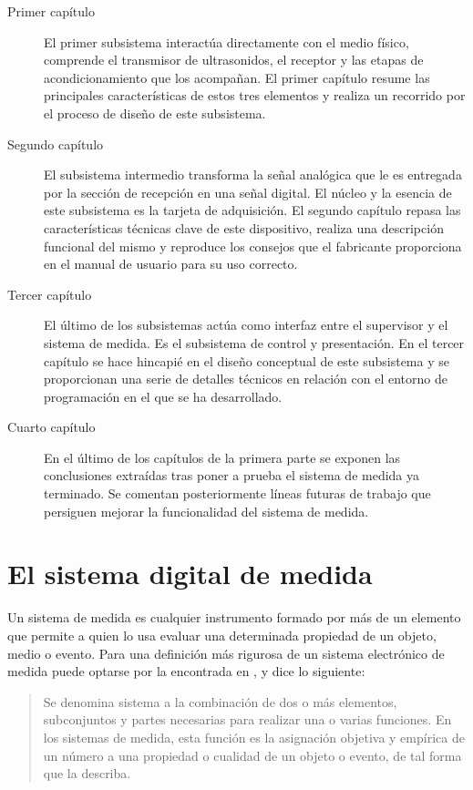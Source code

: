 \begin{description}
    \item[Primer capítulo] El primer subsistema interactúa directamente con
	el medio físico, comprende el transmisor de ultrasonidos, el
	receptor y las etapas de acondicionamiento que los acompañan. El
	primer capítulo resume las principales características de estos
	tres elementos y realiza un recorrido por el proceso de diseño de
	este subsistema.
    \item[Segundo capítulo] El subsistema intermedio transforma la señal
	analógica que le es entregada por la sección de recepción en una
	señal digital. El núcleo y la esencia de este subsistema es la
	tarjeta de adquisición. El segundo capítulo repasa las
	características técnicas clave de este dispositivo, realiza una
	descripción funcional del mismo y reproduce los consejos que el
	fabricante proporciona en el manual de usuario para su uso
	correcto.
    \item[Tercer capítulo] El último de los subsistemas actúa como interfaz
	entre el supervisor y el sistema de medida. Es el subsistema de
	control y presentación. En el tercer capítulo se hace hincapié en
	el diseño conceptual de este subsistema y se proporcionan una serie
	de detalles técnicos en relación con el entorno de programación en
	el que se ha desarrollado.
    \item[Cuarto capítulo] En el último de los capítulos de la primera
	parte se exponen las conclusiones extraídas tras poner a prueba el
	sistema de medida ya terminado. Se comentan posteriormente líneas
	futuras de trabajo que persiguen mejorar la funcionalidad del
	sistema de medida.
\end{description}


\section*{El sistema digital de medida}

Un sistema de medida es cualquier instrumento formado por más de un
elemento que permite a quien lo usa evaluar una determinada propiedad de un
objeto, medio o evento. Para una definición más rigurosa de un sistema
electrónico de medida puede optarse por la encontrada en
\cite{pallas2004sas}, y dice lo siguiente:

{\small\begin{quotation}
    Se denomina sistema a la combinación de dos o más elementos,
    subconjuntos y partes necesarias para realizar una o varias
    funciones. En los sistemas de medida, esta función es la asignación
    objetiva y empírica de un número a una propiedad o cualidad de un
    objeto o evento, de tal forma que la describa.
\end{quotation}}

